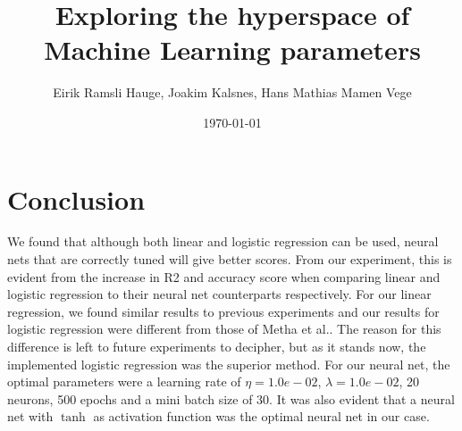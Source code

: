 \documentclass[11pt]{article}
\title{Exploring the hyperspace of Machine Learning parameters}
\author{Eirik Ramsli Hauge, Joakim Kalsnes, Hans Mathias Mamen Vege}
\date{\today}
\begin{document}
\section{Conclusion}
We found that although both linear and logistic regression can be used, neural nets that are correctly tuned will give better scores. From our experiment, this is evident from the increase in R2 and accuracy score when comparing linear and logistic regression to their neural net counterparts respectively. For our linear regression, we found similar results to previous experiments and our results for logistic regression were different from those of Metha et al.. The reason for this difference is left to future experiments to decipher, but as it stands now, the implemented logistic regression was the superior method. For our neural net, the optimal parameters were a learning rate of $\eta = 1.0e-02$, $\lambda = 1.0e-02$, 20 neurons, 500 epochs and a mini batch size of 30. It was also evident that a neural net with $\tanh$ as activation function was the optimal neural net in our case.
\end{document}
